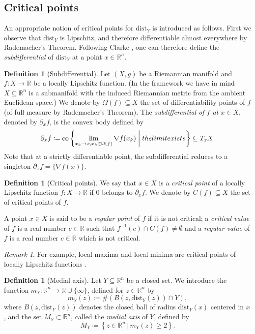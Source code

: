 \documentclass{amsart}
\newcommand{\R}{\mathbb{R}}
\newcommand{\dd}{\mathrm{dist}}
\theoremstyle{definition}
\newtheorem{definition}[subsubsection]{Definition}
\theoremstyle{remark}
\newtheorem{remark}[subsubsection]{Remark}
\begin{document}
\subsection{Critical points}

An appropriate notion of critical points for $\dd_Y$ is introduced as follows. First we observe that $\dd_{Y}$ is Lipschitz, and therefore differentiable almost everywhere by Rademacher's Theorem. Following Clarke \cite{Clarke}, one can therefore define the \emph{subdifferential} of $\dd_{Y}$ at a point $x\in \R^n$. 

\begin{definition}[Subdifferential]\label{def:subdifferential}
Let $(X, g)$ be a Riemannian manifold and  $f \colon X\to \R$
be a locally Lipschitz function. (In the framework we have in mind $X\subseteq \R^n$ is a submanifold with the induced Riemannian metric from the ambient Euclidean space.) We denote by $\Omega(f) \subseteq X$ the set of differentiability points of $f$ (of full measure by Rademacher's Theorem). The \emph{subdifferential of $f$ at $x\in X$}, denoted by $\partial_x f$, is the convex body defined by
\[
\partial_xf \coloneqq \mathrm{co}\left\{ \lim_{x_k \to x, x_k \in \Omega(f)} \nabla f(x_k) \; \middle| \; \textnormal{the limit exists}\right\} \subseteq T_x X.
\]
Note that at a strictly differentiable point, the subdifferential reduces to a singleton $\partial_x f = \{\nabla f(x)\}$.
\end{definition}


\begin{definition}[Critical points]
\label{D:critical}
We say that $x \in X$ is a \emph{critical point} of a locally Lipschitz function $f \colon X\to \R$ if $0$ belongs to $\partial_x f$. We denote by $C(f) \subseteq X$ the set of critical points of $f$. 

A point $x\in X$ is said to be a \emph{regular point} of $f$ if it is not critical; a \emph{critical value} of $f$ is a real number $c \in \R$ such that $f^{-1}(c) \cap C(f) \neq \emptyset$ and a \emph{regular value} of $f$ is a real number $c \in \R$ which is not critical.
\end{definition}

\begin{remark}
For example, local maxima and local minima are critical points of locally Lipschitz functions \cite{Rockafellar}.
\end{remark}

\begin{definition}[Medial axis]\label{def:medial}
Let $Y \subseteq \R^n$ be a closed set. We introduce the function $m_{Y} \colon \R^n \to \R \cup \{\infty\}$, defined for $z \in \R^n$ by
\[
m_Y(z) \coloneqq \#\left(B(z, \dd_Y(z)) \cap Y\right),
\]
where $B(z, \dd_Y(z))$ denotes the closed ball of radius $\dd_Y(x)$ centered in $x$, and the set $M_Y \subset \R^n$, called the \emph{medial axis} of $Y$, defined by
\[
M_{Y} \coloneqq \left\{z\in \R^n\,\bigg|\, m_Y(z)\geq 2\right\}.
\]
\end{definition}
\end{document}
